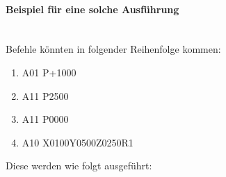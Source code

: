     \paragraph{Beispiel für eine solche Ausführung} \mbox{} \\
    Befehle könnten in folgender Reihenfolge kommen:

        \begin{enumerate}
            \item A01 P+1000
            \item A11 P2500
            \item A11 P0000
            \item A10 X0100Y0500Z0250R1
        \end{enumerate}

    Diese werden wie folgt ausgeführt:

